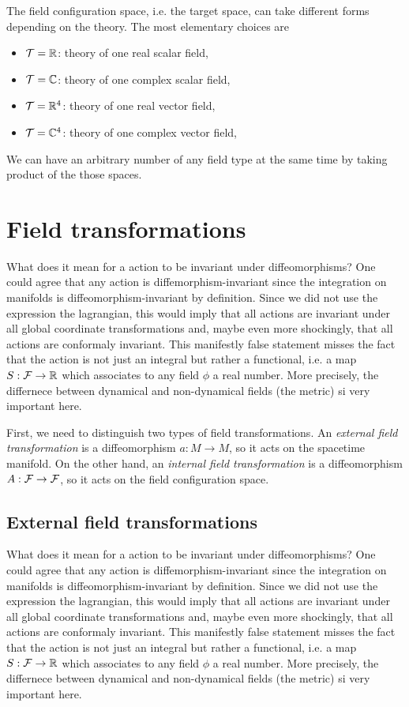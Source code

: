 \documentclass[a4paper,10pt]{article}
\begin{document}
    The field configuration space, i.e. the target space, can take different forms depending on the theory. The most elementary choices are
    \begin{itemize}
        \item $\mathcal{T}=\mathbb{R}$: theory of one real scalar field,
        \item $\mathcal{T}=\mathbb{C}$: theory of one complex scalar field,
        \item $\mathcal{T}=\mathbb{R}^4$: theory of one real vector field,
        \item $\mathcal{T}=\mathbb{C}^4$: theory of one complex vector field,
    \end{itemize}
    We can have an arbitrary number of any field type at the same time by taking product of the those spaces.

\section{Field transformations}

    What does it mean for a action to be invariant under diffeomorphisms? One could agree that any action is diffemorphism-invariant since the integration on manifolds is diffeomorphism-invariant by definition. Since we did not use the expression the lagrangian, this would imply that all actions are invariant under all global coordinate transformations and, maybe even more shockingly, that all actions are conformaly invariant. This manifestly false statement misses the fact that the action is not just an integral but rather a functional, i.e. a map $S:\mathcal{F}\to\mathbb{R}$ which associates to any field $\phi$ a real number. More precisely, the differnece between dynamical and non-dynamical fields (the metric) si very important here.

    First, we need to distinguish two types of field transformations. An \emph{external field transformation} is a diffeomorphism $a:M\to M$, so it acts on the spacetime manifold. On the other hand, an \emph{internal field transformation} is a diffeomorphism $A:\mathcal{F}\to\mathcal{F}$, so it acts on the field configuration space.

    \subsection{External field transformations}

        What does it mean for a action to be invariant under diffeomorphisms? One could agree that any action is diffemorphism-invariant since the integration on manifolds is diffeomorphism-invariant by definition. Since we did not use the expression the lagrangian, this would imply that all actions are invariant under all global coordinate transformations and, maybe even more shockingly, that all actions are conformaly invariant. This manifestly false statement misses the fact that the action is not just an integral but rather a functional, i.e. a map $S:\mathcal{F}\to\mathbb{R}$ which associates to any field $\phi$ a real number. More precisely, the differnece between dynamical and non-dynamical fields (the metric) si very important here.
\end{document}
